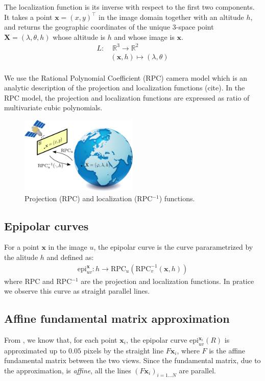 \documentclass[paper=a4, fontsize=11pt, onecolumn, tikz, dvipsnames, svgnames, x11names]{article}
\begin{document}
The localization function is its
inverse with respect to the first two components. It takes a point $\textbf{x}
= (x, y)^\top$ in the image domain together with an altitude $h$, and
returns the geographic coordinates of the unique 3-space point
$\textbf{X} = (\lambda, \theta, h)$ whose altitude is $h$ and whose image is $\textbf{x}$.
\begin{align*}
L:&\; \mathbb{R}^3\to\mathbb{R}^2\\
&(\textbf{x}, h) \mapsto (\lambda, \theta)
\end{align*}\\



We use the Rational Polynomial Coefficient (RPC) camera model which is an
analytic description of the projection and localization functions (cite). In the RPC model, the projection and
localization functions are expressed as ratio of multivariate cubic
polynomials.

\begin{figure}[h]
    \centering
    \includegraphics[width=0.5\textwidth]{figures/rpc_illustration.png}
   \caption{ Projection (RPC) and localization (RPC$^{-1}$) functions.}
   \label{rpc}
\end{figure}

\subsection{Epipolar curves}
For a point $\textbf{x}$ in the image $u$, the epipolar curve is the curve pararametrized by the alitude $h$ and defined as:
\begin{align*}
\text{epi}_{uv}^{\textbf{x}} : h \rightarrow \text{RPC}_u(\text{RPC}^{-1}_v(\textbf{x}, h))
\end{align*}
where RPC and RPC$^{-1}$ are the projection and localization functions. In pratice we observe this curve as straight parallel lines.

\subsection{Affine fundamental matrix approximation}
From  \cite{carlo_2014_pushbroom}, we know that, for each point $\textbf{x}_i$, the epipolar curve $\text{epi}^{\textbf{x}_i}_{u v}(R)$ is approximated up to $0.05$ pixels by the straight line $F\textbf{x}_i$, where $F$ is
the affine fundamental matrix between the two views. Since the fundamental matrix, due to the approximation, is \textit{affine}, all the lines $(F\textbf{x}_i)_{i=1...N}$ are parallel.
\end{document}
